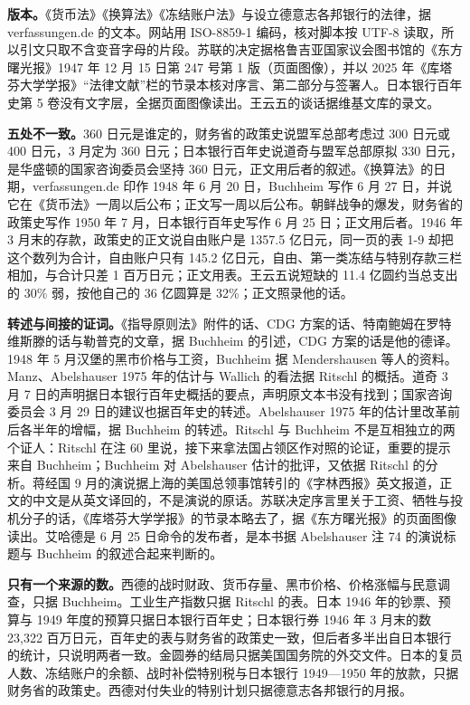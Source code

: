 \begin{deeper}[史料说明]
\textbf{版本。}《货币法》《换算法》《冻结账户法》与设立德意志各邦银行的法律，据 verfassungen.de 的文本。网站用 ISO-8859-1 编码，核对脚本按 UTF-8 读取，所以引文只取不含变音字母的片段。苏联的决定据格鲁吉亚国家议会图书馆的《东方曙光报》1947 年 12 月 15 日第 247 号第 1 版（页面图像），并以 2025 年《库塔芬大学学报》“法律文献”栏的节录本核对序言、第二部分与签署人。日本银行百年史第 5 卷没有文字层，全据页面图像读出。王云五的谈话据维基文库的录文。

\textbf{五处不一致。}360 日元是谁定的，财务省的政策史说盟军总部考虑过 300 日元或 400 日元，3 月定为 360 日元；日本银行百年史说道奇与盟军总部原拟 330 日元，是华盛顿的国家咨询委员会坚持 360 日元，正文用后者的叙述。《换算法》的日期，verfassungen.de 印作 1948 年 6 月 20 日，Buchheim 写作 6 月 27 日，并说它在《货币法》一周以后公布；正文写一周以后公布。朝鲜战争的爆发，财务省的政策史写作 1950 年 7 月，日本银行百年史写作 6 月 25 日；正文用后者。1946 年 3 月末的存款，政策史的正文说自由账户是 1357.5 亿日元，同一页的表 1-9 却把这个数列为合计，自由账户只有 145.2 亿日元，自由、第一类冻结与特别存款三栏相加，与合计只差 1 百万日元；正文用表。王云五说短缺的 11.4 亿圆约当总支出的 30\% 弱，按他自己的 36 亿圆算是 32\%；正文照录他的话。

\textbf{转述与间接的证词。}《指导原则法》附件的话、CDG 方案的话、特南鲍姆在罗特维斯滕的话与勒普克的文章，据 Buchheim 的引述，CDG 方案的话是他的德译。1948 年 5 月汉堡的黑市价格与工资，Buchheim 据 Mendershausen 等人的资料。Manz、Abelshauser 1975 年的估计与 Wallich 的看法据 Ritschl 的概括。道奇 3 月 7 日的声明据日本银行百年史概括的要点，声明原文本书没有找到；国家咨询委员会 3 月 29 日的建议也据百年史的转述。Abelshauser 1975 年的估计里改革前后各半年的增幅，据 Buchheim 的转述。Ritschl 与 Buchheim 不是互相独立的两个证人：Ritschl 在注 60 里说，接下来拿法国占领区作对照的论证，重要的提示来自 Buchheim；Buchheim 对 Abelshauser 估计的批评，又依据 Ritschl 的分析。蒋经国 9 月的演说据上海的美国总领事馆转引的《字林西报》英文报道，正文的中文是从英文译回的，不是演说的原话。苏联决定序言里关于工资、牺牲与投机分子的话，《库塔芬大学学报》的节录本略去了，据《东方曙光报》的页面图像读出。艾哈德是 6 月 25 日命令的发布者，是本书据 Abelshauser 注 74 的演说标题与 Buchheim 的叙述合起来判断的。

\textbf{只有一个来源的数。}西德的战时财政、货币存量、黑市价格、价格涨幅与民意调查，只据 Buchheim。工业生产指数只据 Ritschl 的表。日本 1946 年的钞票、预算与 1949 年度的预算只据日本银行百年史；日本银行券 1946 年 3 月末的数 23,322 百万日元，百年史的表与财务省的政策史一致，但后者多半出自日本银行的统计，只说明两者一致。金圆券的结局只据美国国务院的外交文件。日本的复员人数、冻结账户的余额、战时补偿特别税与日本银行 1949—1950 年的放款，只据财务省的政策史。西德对付失业的特别计划只据德意志各邦银行的月报。


\end{deeper}
